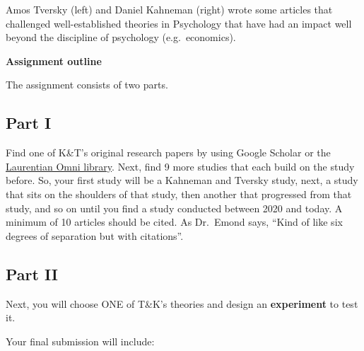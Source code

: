 \documentclass[
]{html}
\theoremstyle{definition}
\theoremstyle{definition}
\theoremstyle{definition}
\theoremstyle{definition}
\theoremstyle{remark}
\begin{document}
Amos Tversky (left) and Daniel Kahneman (right) wrote some articles that challenged well-established theories in Psychology that have had an impact well beyond the discipline of psychology (e.g.~economics).

\textbf{Assignment outline}

The assignment consists of two parts.

\hypertarget{Part1}{%
\subsection{Part I}\label{Part1}}

Find one of K\&T's original research papers by using Google Scholar or the \href{https://omni.laurentian.ca/discovery/search?vid=01OCUL_LU:OMNI\&lang=en}{Laurentian Omni library}. Next, find 9 more studies that each build on the study before. So, your first study will be a Kahneman and Tversky study, next, a study that sits on the shoulders of that study, then another that progressed from that study, and so on until you find a study conducted between 2020 and today. A minimum of 10 articles should be cited. As Dr.~Emond says, ``Kind of like six degrees of separation but with citations''.

\hypertarget{Part2}{%
\subsection{Part II}\label{Part2}}

Next, you will choose ONE of T\&K's theories and design an \textbf{experiment} to test it.

Your final submission will include:
\end{document}
